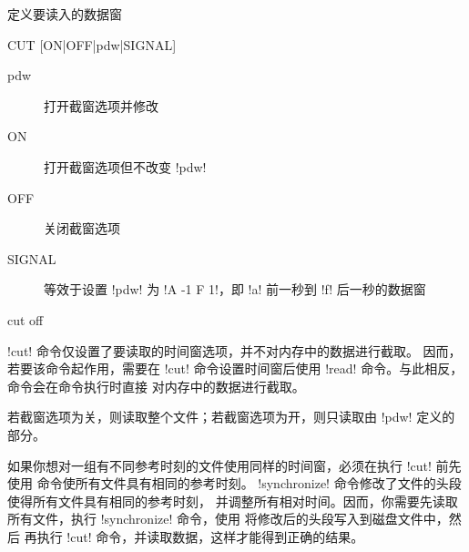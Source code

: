 \label{cmd:cut}

定义要读入的数据窗

\begin{SACSTX}
CUT [ON|OFF|pdw|SIGNAL]
\end{SACSTX}

\begin{description}
\item [pdw] 打开截窗选项并修改 
\item [ON] 打开截窗选项但不改变 !pdw!
\item [OFF] 关闭截窗选项
\item [SIGNAL] 等效于设置 !pdw! 为 !A -1 F 1!，即 !a!
    前一秒到 !f! 后一秒的数据窗
\end{description}

\begin{SACDFT}
cut off
\end{SACDFT}

!cut! 命令仅设置了要读取的时间窗选项，并不对内存中的数据进行截取。
因而，若要该命令起作用，需要在 !cut! 命令设置时间窗后使用
!read! 命令。与此相反， 命令会在命令执行时直接
对内存中的数据进行截取。

若截窗选项为关，则读取整个文件；若截窗选项为开，则只读取由 !pdw!
定义的部分。

如果你想对一组有不同参考时刻的文件使用同样的时间窗，必须在执行 !cut!
前先使用  命令使所有文件具有相同的参考时刻。
!synchronize! 命令修改了文件的头段使得所有文件具有相同的参考时刻，
并调整所有相对时间。因而，你需要先读取所有文件，执行 !synchronize!
命令，使用  将修改后的头段写入到磁盘文件中，然后
再执行 !cut! 命令，并读取数据，这样才能得到正确的结果。

